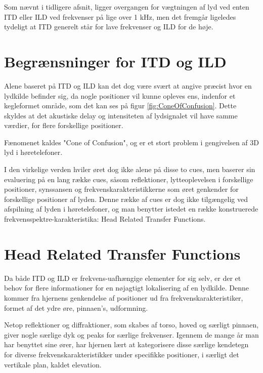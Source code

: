 Som nævnt i tidligere afsnit, ligger overgangen for vægtningen af lyd ved enten ITD eller ILD ved frekvenser på lige over 1 kHz, men det fremgår ligeledes tydeligt at ITD generelt står for lave frekvenser og ILD for de høje.

\section{Begrænsninger for ITD og ILD} 
Alene baseret på ITD og ILD kan det dog være svært at angive præcist hvor en lydkilde befinder sig, da nogle positioner vil kunne opleves ens, indenfor et kegleformet område, som det kan ses på figur \ref{fig:ConeOfConfusion}. Dette skyldes at det akustiske delay og intensiteten af lydsignalet vil have samme værdier, for flere forskellige positioner. 


Fænomenet kaldes "Cone of Confusion", og er et stort problem i gengivelsen af 3D lyd i høretelefoner.%

I den virkelige verden hviler øret dog ikke alene på disse to cues, men baserer sin evaluering på en lang række cues, såsom reflektioner, lytteoplevelsen i forskellige positioner, synssansen og frekvenskarakteristikkerne som øret genkender for forskellige positioner af lyden. Denne række af cues er dog ikke tilgængelig ved afspilning af lyden i høretelefoner, og man benytter istedet en række konstruerede frekvensspektre-karakteristika: Head Related Transfer Functions.

\section{Head Related Transfer Functions}
\label{sec:HRTF}

Da både ITD og ILD er frekvens-uafhængige elementer for sig selv, er der et behov for flere informationer for en nøjagtigt lokalisering af en lydkilde. Denne kommer fra hjernens genkendelse af positioner ud fra frekvenskarakteristiker, formet af det ydre øre, pinnaen's, udformning. 

Netop reflektioner og diffraktioner, som skabes af torso, hoved og særligt pinnaen, giver nogle særlige dyk og peaks for særlige frekvenser. Igennem de mange år man har benyttet sine ører, har hjernen lært at kategorisere disse særlige kendetegn for diverse frekvenskarakteristikker under specifikke positioner, i særligt det vertikale plan, kaldet elevation.	

